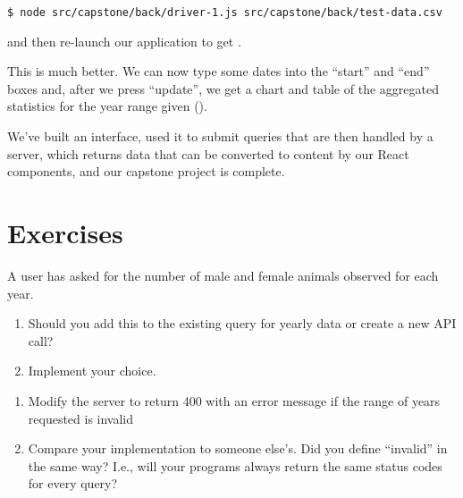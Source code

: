 \begin{verbatim}
$ node src/capstone/back/driver-1.js src/capstone/back/test-data.csv
\end{verbatim}

\noindent
and then re-launch our application to get .


This is much better.
We can now type some dates into the ``start'' and ``end'' boxes and,
after we press ``update'',
we get a chart and table of the aggregated statistics for the year range given
().


We've built an interface,
used it to submit queries that are then handled by a server,
which returns data that can be converted to content by our React components,
and our capstone project is complete.

\section{Exercises}\label{s:capstone-exercises}


A user has asked for the number of male and female animals observed for each year.

\begin{enumerate}
\item
  Should you add this to the existing query for yearly data or create a new API call?
\item
  Implement your choice.
\end{enumerate}


\begin{enumerate}
\item
  Modify the server to return 400 with an error message
  if the range of years requested is invalid
\item
  Compare your implementation to someone else's.
  Did you define ``invalid'' in the same way?
  I.e., will your programs always return the same status codes for every query?
\end{enumerate}


